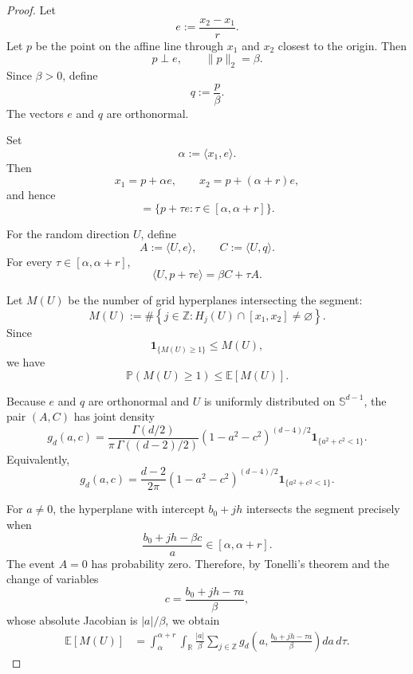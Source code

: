 \begin{proof}
Let
\[
    e:=\frac{x_2-x_1}{r}.
\]
Let $p$ be the point on the affine line through $x_1$ and $x_2$ closest
to the origin. Then
\[
    p\perp e,
    \qquad
    \|p\|_2=\beta.
\]
Since $\beta>0$, define
\[
    q:=\frac{p}{\beta}.
\]
The vectors $e$ and $q$ are orthonormal.

Set
\[
    \alpha:=\langle x_1,e\rangle.
\]
Then
\[
    x_1=p+\alpha e,
    \qquad
    x_2=p+(\alpha+r)e,
\]
and hence
\begin{equation}
    [x_1,x_2]
    =
    \{
        p+\tau e:
        \tau\in[\alpha,\alpha+r]
    \}.
    \label{eq:segment-parameterization}
\end{equation}

For the random direction $U$, define
\[
    A:=\langle U,e\rangle,
    \qquad
    C:=\langle U,q\rangle.
\]
For every $\tau\in[\alpha,\alpha+r]$,
\begin{equation}
    \langle U,p+\tau e\rangle
    =
    \beta C+\tau A.
    \label{eq:projected-line}
\end{equation}

Let $M(U)$ be the number of grid hyperplanes intersecting the segment:
\begin{equation}
    M(U)
    :=
    \#
    \left\{
        j\in\mathbb{Z}:
        H_j(U)\cap[x_1,x_2]\neq\varnothing
    \right\}.
    \label{eq:intersection-count}
\end{equation}
Since
\[
    \mathbf{1}_{\{M(U)\geq1\}}
    \leq
    M(U),
\]
we have
\begin{equation}
    \mathbb{P}(M(U)\geq1)
    \leq
    \mathbb{E}[M(U)].
    \label{eq:probability-by-count}
\end{equation}

Because $e$ and $q$ are orthonormal and $U$ is uniformly distributed
on $\mathbb{S}^{d-1}$, the pair $(A,C)$ has joint density
\begin{equation}
    g_d(a,c)
    =
    \frac{\Gamma(d/2)}
         {\pi\,\Gamma((d-2)/2)}
    \left(
        1-a^2-c^2
    \right)^{(d-4)/2}
    \mathbf{1}_{\{a^2+c^2<1\}}.
    \label{eq:two-coordinate-density}
\end{equation}
Equivalently,
\begin{equation}
    g_d(a,c)
    =
    \frac{d-2}{2\pi}
    \left(
        1-a^2-c^2
    \right)^{(d-4)/2}
    \mathbf{1}_{\{a^2+c^2<1\}}.
    \label{eq:two-coordinate-density-simple}
\end{equation}

For $a\neq0$, the hyperplane with intercept $b_0+jh$ intersects the
segment precisely when
\[
    \frac{b_0+jh-\beta c}{a}
    \in
    [\alpha,\alpha+r].
\]
The event $A=0$ has probability zero. Therefore, by Tonelli's theorem
and the change of variables
\[
    c
    =
    \frac{b_0+jh-\tau a}{\beta},
\]
whose absolute Jacobian is $|a|/\beta$, we obtain
\begin{align}
    \mathbb{E}[M(U)]
    &=
    \int_{\alpha}^{\alpha+r}
    \int_{\mathbb{R}}
    \frac{|a|}{\beta}
    \sum_{j\in\mathbb{Z}}
    g_d
    \left(
        a,
        \frac{b_0+jh-\tau a}{\beta}
    \right)
    da\,d\tau.
    \label{eq:expected-intersection-count}
\end{align}


\end{proof}
